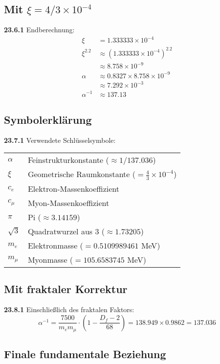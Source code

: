 \documentclass[12pt,a4paper]{article}
\begin{document}
\subsection{Mit $\xi = 4/3 \times 10^{-4}$}
\noindent \textbf{23.6.1} Endberechnung:
\begin{align}
	\xi &= 1.333333 \times 10^{-4} \\
	\xi^{2.2} &\approx (1.333333 \times 10^{-4})^{2.2} \\
	&\approx 8.758 \times 10^{-9} \\
	\alpha &\approx 0.8327 \times 8.758 \times 10^{-9} \\
	&\approx 7.292 \times 10^{-3} \\
	\alpha^{-1} &\approx 137.13
\end{align}

\subsection{Symbolerklärung}

\noindent \textbf{23.7.1} Verwendete Schlüsselsymbole:

\begin{tabular}{ll}
	$\alpha$ & Feinstrukturkonstante ($\approx 1/137.036$) \\
	$\xi$ & Geometrische Raumkonstante ($= \frac{4}{3} \times 10^{-4}$) \\
	$c_e$ & Elektron-Massenkoeffizient \\
	$c_\mu$ & Myon-Massenkoeffizient \\
	$\pi$ & Pi ($\approx 3.14159$) \\
	$\sqrt{3}$ & Quadratwurzel aus 3 ($\approx 1.73205$) \\
	$m_e$ & Elektronmasse ($= 0.5109989461$ MeV) \\
	$m_\mu$ & Myonmasse ($= 105.6583745$ MeV) \\
\end{tabular}

\subsection{Mit fraktaler Korrektur}

\noindent \textbf{23.8.1} Einschließlich des fraktalen Faktors:
\[
\alpha^{-1} = \frac{7500}{m_e m_\mu} \cdot \left(1 - \frac{D_f - 2}{68}\right) = 138.949 \times 0.9862 = 137.036
\]

\subsection{Finale fundamentale Beziehung}
\end{document}
